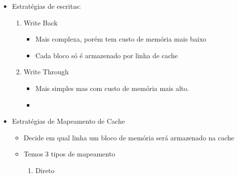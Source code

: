 \documentclass[12pt]{article}
\begin{document}
\begin{itemize}
\begin{itemize}
\begin{itemize}
        \end{itemize}
        \item FIFO -- First in, First out
        \begin{itemize}
            \item Retira a linha que está na memória a mais tempo
        \end{itemize}
        \item Random
        \item LFU -- Less Frequently Used
        \begin{itemize}
            \item Retira a linha que foi usada com a menor frequencia dentro do 
            programa
        \end{itemize}
        \item Dependendo da localidade, esses algoritmos podem ser mais e menos 
        eficientes, aumentando os hits ou misses.
        \item gem5 -- Fazer testes, usando o modo SE
    \end{itemize}
    \item Estratégias de escritas:
    \begin{enumerate}[label=\alph*.]
        \item Write Back
        \begin{itemize}
            \item Mais complexa, porém tem custo de memória mais baixo
            \item Cada bloco só é armazenado por linha de cache
        \end{itemize}
        \item Write Through
        \begin{itemize}
            \item Mais simples mas com custo de memória mais alto.
            \item 
        \end{itemize}
    \end{enumerate}
    \item Estratégias de Mapeamento de Cache
    \begin{itemize}
        \item Decide em qual linha um bloco de memória será armazenado na cache
        \item Temos 3 tipos de mapeamento
        \begin{enumerate}
            \item Direto
            \begin{itemize}

\end{itemize}
\end{enumerate}
\end{itemize}
\end{itemize}
\end{document}
